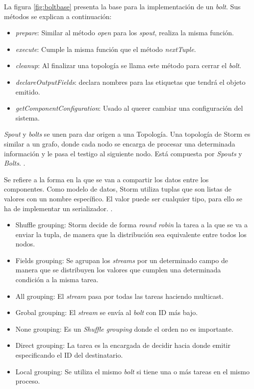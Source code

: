 La figura \ref{fig:boltbase} presenta la base para la implementación de un \textit{bolt}. Sus métodos se explican a continuación:

\begin{itemize}
\item \textit{prepare}: Similar al método \textit{open} para los \textit{spout}, realiza la misma función.
\item \textit{execute}: Cumple la misma función que el método \textit{nextTuple}.
\item \textit{cleanup}: Al finalizar una topología se llama este método para cerrar el \textit{bolt}.
\item \textit{declareOutputFields}: declara nombres para las etiquetas que tendrá el objeto emitido.
\item \textit{getComponentConfiguration}: Usado al querer cambiar una configuración del sistema.
\end{itemize}

\textit{Spout} y \textit{bolts} se unen para dar origen a una Topología. Una topología de Storm es similar a un grafo, donde cada nodo se encarga de procesar una determinada información y le pasa el testigo al siguiente nodo. Está compuesta por \textit{Spouts} y \textit{Bolts}. \cite{Storm}.

Se refiere a la forma en la que se van a compartir los datos entre los componentes. Como modelo de datos, Storm utiliza tuplas que son listas de valores con un nombre específico. El valor puede ser cualquier tipo, para ello se ha de implementar un serializador. \cite{Storm}.

\begin{itemize}
\item Shuffle grouping: Storm decide de forma \textit{round robin} la tarea a la que se va a enviar la tupla, de manera que la distribución sea equivalente entre todos los nodos.
\item Fields grouping: Se agrupan los \textit{streams} por un determinado campo de manera que se distribuyen los valores que cumplen una determinada condición a la misma tarea.
\item All grouping: El \textit{stream} pasa por todas las tareas haciendo multicast.
\item Grobal grouping: El \textit{stream} se envía al \textit{bolt} con ID más bajo.
\item None grouping: Es un \textit{Shuffle grouping} donde el orden no es importante.
\item Direct grouping: La tarea es la encargada de decidir hacia donde emitir especificando el ID del destinatario.
\item Local grouping: Se utiliza el mismo \textit{bolt} si tiene una o más tareas en el mismo proceso.
\end{itemize}

